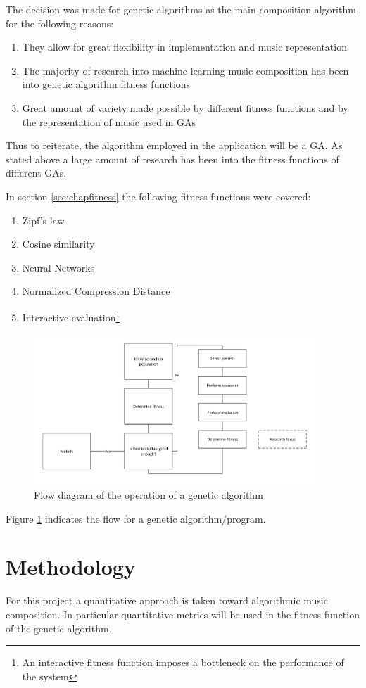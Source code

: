 The decision was made for genetic algorithms as the main composition algorithm for the following reasons:
\begin{enumerate}
\item They allow for great flexibility in implementation and music representation
\item The majority of research into machine learning music composition has been into genetic algorithm fitness functions
\item Great amount of variety made possible by different fitness functions and by the representation of music used in \acp{GA}
\end{enumerate}

Thus to reiterate, the algorithm employed in the application will be a \ac{GA}. As stated above a large amount of research has been into the fitness functions of different \acp{GA}.

In section \ref{sec:chapfitness} the following fitness functions were covered:
\begin{enumerate}
\item Zipf's law
\item Cosine similarity
\item Neural Networks
\item Normalized Compression Distance
\item Interactive evaluation\footnote{An interactive fitness function imposes a bottleneck on the performance of the system}
\end{enumerate}

\begin{figure}
\centerline{\includegraphics[width=400px]{../images/GA_flow.pdf}}
\caption{Flow diagram of the operation of a genetic algorithm}
\label{ims:geneticflow}
\end{figure}

Figure \ref{ims:geneticflow} indicates the flow for a genetic algorithm/program.

\chapter{Methodology}
For this project a quantitative approach is taken toward algorithmic music composition. In particular quantitative metrics will be used in the fitness function of the genetic algorithm.

